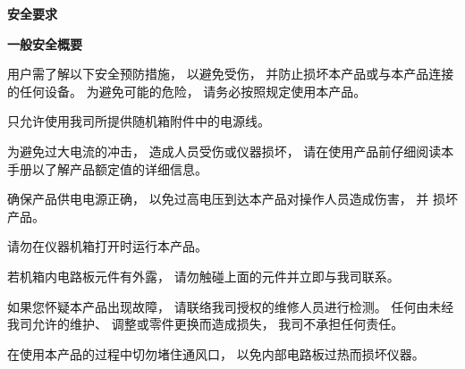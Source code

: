 
\newpage
\xiaoer \textbf{安全要求}
\vspace{1.1cm}

\noindent\sanhao\textbf{一般安全概要}
\vspace{0.7cm}
\song

用户需了解以下安全预防措施， 以避免受伤， 并防止损坏本产品或与本产品连接的任何设备。 为避免可能的危险， 请务必按照规定使用本产品。

\vspace{0.6cm}

只允许使用我司所提供随机箱附件中的电源线。

\vspace{0.6cm}

为避免过大电流的冲击， 造成人员受伤或仪器损坏， 请在使用产品前仔细阅读本手册以了解产品额定值的详细信息。

\vspace{0.6cm}

确保产品供电电源正确， 以免过高电压到达本产品对操作人员造成伤害， 并
损坏产品。

\vspace{0.6cm}

请勿在仪器机箱打开时运行本产品。

\vspace{0.6cm}

若机箱内电路板元件有外露， 请勿触碰上面的元件并立即与我司联系。

\vspace{0.6cm}

如果您怀疑本产品出现故障， 请联络我司授权的维修人员进行检测。 任何由未经我司允许的维护、 调整或零件更换而造成损失， 我司不承担任何责任。

\vspace{0.6cm}

在使用本产品的过程中切勿堵住通风口， 以免内部电路板过热而损坏仪器。

